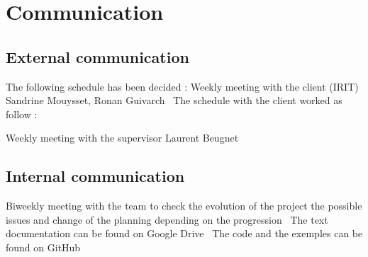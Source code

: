 \section{Communication}
\subsection{External communication}
The following schedule has been decided :
Weekly meeting with the client (IRIT) Sandrine Mouysset, Ronan Guivarch
\
The schedule with the client worked as follow :


Weekly meeting with the supervisor Laurent Beugnet
\
\subsection{Internal communication}
Biweekly meeting with the team to check the evolution of the project the possible issues and change of the planning depending on the progression
\
The text documentation can be found on Google Drive
\
The code and the exemples can be found on  GitHub


